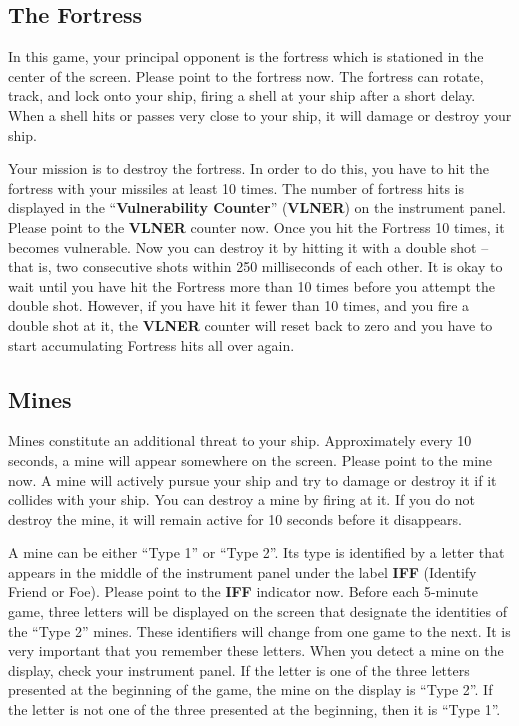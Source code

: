\documentclass[letterpaper,12pt]{article}
\begin{document}
\subsection{The Fortress}

In this game, your principal opponent is the fortress which is stationed in the center of the
screen. Please point to the fortress now. The fortress can rotate, track, and lock onto your ship,
firing a shell at your ship after a short delay. When a shell hits or passes very close to your
ship, it will damage or destroy your ship.

Your mission is to destroy the fortress. In order to do this, you have to hit the fortress with your
missiles at least 10 times. The number of fortress hits is displayed in the ``\textbf{Vulnerability
Counter}'' (\textbf{VLNER}) on the instrument panel. Please point to the \textbf{VLNER} counter now.
Once you hit the Fortress 10 times, it becomes vulnerable. Now you can destroy it by hitting it with
a double shot – that is, two consecutive shots within 250 milliseconds of each other. It is okay to
wait until you have hit the Fortress more than 10 times before you attempt the double shot. However,
if you have hit it fewer than 10 times, and you fire a double shot at it, the \textbf{VLNER} counter
will reset back to zero and you have to start accumulating Fortress hits all over again.

\subsection{Mines}

Mines constitute an additional threat to your ship. Approximately every 10 seconds, a mine will
appear somewhere on the screen. Please point to the mine now. A mine will actively pursue your ship
and try to damage or destroy it if it collides with your ship. You can destroy a mine by firing at
it. If you do not destroy the mine, it will remain active for 10 seconds before it disappears.

A mine can be either ``Type 1'' or ``Type 2''. Its type is identified by a letter that appears in
the middle of the instrument panel under the label \textbf{IFF} (Identify Friend or Foe). Please
point to the \textbf{IFF} indicator now. Before each 5-minute game, three letters will be displayed
on the screen that designate the identities of the ``Type 2'' mines. These identifiers will change
from one game to the next. It is very important that you remember these letters. When you detect a
mine on the display, check your instrument panel. If the letter is one of the three letters
presented at the beginning of the game, the mine on the display is ``Type 2''. If the letter is not
one of the three presented at the beginning, then it is ``Type 1''.
\end{document}
